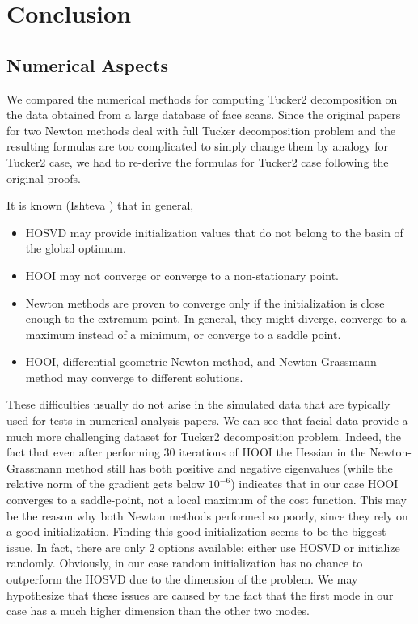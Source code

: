 \chapter{Conclusion}
\label{chap_conclusion}

\section{Numerical Aspects}
We compared the numerical methods for computing Tucker2 decomposition
on the data obtained from a large database of face scans. 
Since the original papers for two Newton methods deal with full Tucker
decomposition problem and the resulting formulas
are too complicated to simply change them by analogy for Tucker2 case,
we had to re-derive the formulas for Tucker2 case following the original proofs.


It is known (Ishteva \cite{ishteva_thesis}) that in general,
\begin{itemize}
    \item HOSVD may provide initialization values that do not belong to the basin of the global optimum.
    \item HOOI may not converge or converge to a non-stationary point.
    \item Newton methods are proven to converge only if the initialization is
        close enough to the extremum point. In general, they might diverge,
        converge to a maximum instead of a minimum, or converge to a saddle point.
    \item HOOI, differential-geometric Newton method, and Newton-Grassmann
        method may converge to different solutions. 
\end{itemize}
These difficulties usually do not arise in the simulated data that
are typically used for tests in numerical analysis papers.
We can see that facial data provide a much more challenging dataset
for Tucker2 decomposition problem.
Indeed, the fact that even after performing $30$ iterations
of HOOI the Hessian in the Newton-Grassmann method still has both
positive and negative eigenvalues (while the relative norm of the gradient gets below $10^{-6}$)
indicates that in our case 
HOOI converges to a saddle-point, not a local maximum of the cost function.
This may be the reason why both Newton methods performed so poorly, since they rely on a good initialization. 
Finding this good initialization seems to be the biggest issue.
In fact, there are only $2$ options available: either
use HOSVD or initialize randomly. Obviously, 
in our case random initialization has no chance to outperform the HOSVD due 
to the dimension of the problem.  
We may hypothesize that these issues are caused by the fact that 
the first mode in our case has a much higher dimension than the other two modes.



